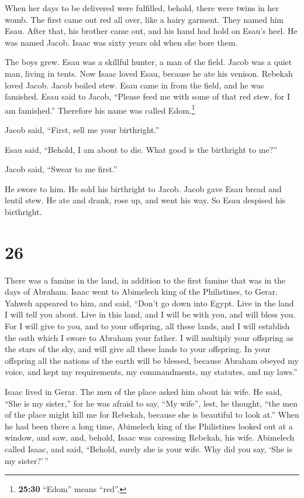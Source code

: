  When her days to be delivered were fulfilled, behold,
there were twins in her womb.  The first came out red all
over, like a hairy garment. They named him Esau.  After
that, his brother came out, and his hand had hold on Esau's heel. He was
named Jacob. Isaac was sixty years old when she bore them.

 The boys grew. Esau was a skillful hunter, a man of the
field. Jacob was a quiet man, living in tents.  Now Isaac
loved Esau, because he ate his venison. Rebekah loved Jacob.
 Jacob boiled stew. Esau came in from the field, and he
was famished.  Esau said to Jacob, ``Please feed me with
some of that red stew, for I am famished.'' Therefore his name was
called Edom.\footnote{\textbf{25:30} ``Edom'' means ``red''.}

 Jacob said, ``First, sell me your birthright.''

 Esau said, ``Behold, I am about to die. What good is the
birthright to me?''

 Jacob said, ``Swear to me first.''

He swore to him. He sold his birthright to Jacob.  Jacob
gave Esau bread and lentil stew. He ate and drank, rose up, and went his
way. So Esau despised his birthright.

\hypertarget{section-25}{%
\section{26}\label{section-25}}

 There was a famine in the land, in addition to the first
famine that was in the days of Abraham. Isaac went to Abimelech king of
the Philistines, to Gerar.  Yahweh appeared to him, and
said, ``Don't go down into Egypt. Live in the land I will tell you
about.  Live in this land, and I will be with you, and
will bless you. For I will give to you, and to your offspring, all these
lands, and I will establish the oath which I swore to Abraham your
father.  I will multiply your offspring as the stars of
the sky, and will give all these lands to your offspring. In your
offspring all the nations of the earth will be blessed, 
because Abraham obeyed my voice, and kept my requirements, my
commandments, my statutes, and my laws.''

 Isaac lived in Gerar.  The men of the place
asked him about his wife. He said, ``She is my sister,'' for he was
afraid to say, ``My wife'', lest, he thought, ``the men of the place
might kill me for Rebekah, because she is beautiful to look at.''
 When he had been there a long time, Abimelech king of the
Philistines looked out at a window, and saw, and, behold, Isaac was
caressing Rebekah, his wife.  Abimelech called Isaac, and
said, ``Behold, surely she is your wife. Why did you say, `She is my
sister?'\,''

